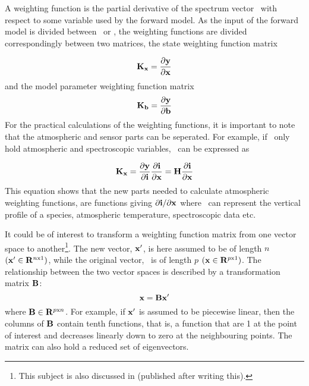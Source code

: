  \label{sec:formalism:wfuns}

 A weighting function is the partial derivative of the spectrum vector
 \y\ with respect to some variable used by the forward model.  As the
 input of the forward model is divided between \xt\ or \bt, the
 weighting functions are divided correspondingly between two matrices,
 the state weighting function matrix

 \begin{equation}
   \mathbf{K_x} = \frac{\partial \mathbf{y}}{\partial \mathbf{x}}
  \label{eq:formalism:kx}
 \end{equation}
 and the model parameter weighting function matrix
 \begin{equation}
   \mathbf{K_b} = \frac{\partial \mathbf{y}}{\partial \mathbf{b}}
  \label{eq:formalism:kb}
 \end{equation}
 For the practical calculations of the weighting functions, it is
 important to note that the atmospheric and sensor parts can be
 seperated. For example, if \xt\ only hold atmospheric and
 spectroscopic variables, \Kx\ can be expressed as

 \begin{equation}
   \mathbf{K_x} = \frac{\partial \mathbf{y}}{\partial \mathbf{i}}\frac{\partial\mathbf{i}}{\partial \mathbf{x}} =
    \mathbf{H}\frac{\partial\mathbf{i}}{\partial \mathbf{x}}
  \label{eq:formalism:kx2}
 \end{equation}
 This equation shows that the new parts needed to calculate
 atmospheric weighting functions, are functions giving $\partial\mathbf{i} /
 \partial \mathbf{x}$ where \xt\ can represent the vertical profile of a
 species, atmospheric temperature, spectroscopic data etc.


 
 It could be of interest to transform a weighting function matrix from
 one vector space to another\footnote{This subject is also discussed
   in \citet{rodgers:00} (published after writing this).}. The new
 vector, $\mathbf{x}'$, is here assumed to be of length $n$ $(\mathbf{x}' \in
 {\bf R}^{n {\mathrm x} 1})$, while the original vector, \xt\ is of length $p$
 $(\mathbf{x} \in {\bf R}^{p {\mathrm x} 1})$.  The relationship between the two vector
 spaces is described by a transformation matrix $\mathbf{B}$:
  \begin{equation}
    \mathbf{x} = \mathbf{B}\mathbf{x}'
  \end{equation}
  where $\mathbf{B} \in {\bf R}^{p {\mathrm x} n}$. For example, if $\mathbf{x}'$ is assumed to be
  piecewise linear, then the columns of $\mathbf{B}$ contain tenth functions,
  that is, a function that are 1 at the point of interest and decreases
  linearly down to zero at the neighbouring points.  The matrix can
  also hold a reduced set of eigenvectors.
    
